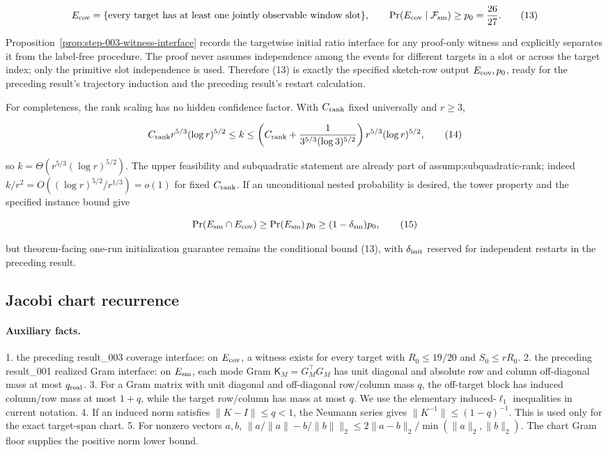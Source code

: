 \[
E_{\rm cov}=\{\text{every target has at least one jointly observable
window slot}\},\qquad
\Pr(E_{\rm cov}\mid\mathcal F_{\rm sm})\ge p_0={26\over27}.
\tag{13}
\]

Proposition~\ref{prop:step-003-witness-interface} records the targetwise initial
ratio interface for any proof-only witness and explicitly separates it from
the label-free procedure. The proof never assumes independence among the
events for different targets in a slot or across the target index; only the
primitive slot independence is used. Therefore (13) is exactly the
specified sketch-row output \(E_{\rm cov},p_0\), ready for the preceding result's
trajectory induction and the preceding result's restart calculation.

For completeness, the rank scaling has no hidden confidence factor. With
\(C_{\rm rank}\) fixed universally and \(r\ge3\),

\[
C_{\rm rank}r^{5/3}(\log r)^{5/2}\le k
\le\left(C_{\rm rank}+{1\over3^{5/3}(\log3)^{5/2}}\right)
 r^{5/3}(\log r)^{5/2},
\tag{14}
\]

so \(k=\Theta(r^{5/3}(\log r)^{5/2})\). The upper feasibility and
subquadratic statement are already part of assump:subquadratic-rank;
indeed \(k/r^2=O((\log r)^{5/2}/r^{1/3})=o(1)\) for fixed
\(C_{\rm rank}\). If an unconditional nested probability is desired, the
tower property and the specified instance bound give

\[
\Pr(E_{\rm sm}\cap E_{\rm cov})\ge
\Pr(E_{\rm sm})\,p_0\ge(1-\delta_{\rm sm})p_0,
\tag{15}
\]

but theorem-facing one-run initialization guarantee remains the
conditional bound (13), with \(\delta_{\rm init}\) reserved for independent
restarts in the preceding result.

\subsection{Jacobi chart recurrence}\label{app:step-004}

\paragraph{Auxiliary facts.}

1. the preceding result\_003 coverage interface: on \(E_{\rm cov}\), a witness
   exists for every target with \(R_0\le19/20\) and \(S_0\le rR_0\).
2. the preceding result\_001 realized Gram interface: on \(E_{\rm sm}\), each mode
   Gram \(\mathsf K_M=G_M^\top G_M\) has unit diagonal and absolute row and column
   off-diagonal mass at most \(q_{\rm real}\).
3. For a Gram matrix with unit diagonal and off-diagonal row/column mass
   \(q\), the off-target block has induced column/row mass at most \(1+q\),
   while the target row/column has mass at most \(q\). We use the elementary
   induced-\(\ell_1\) inequalities in current notation.
4. If an induced norm satisfies \(\|K-I\|\le q<1\), the Neumann series gives
   \(\|K^{-1}\|\le(1-q)^{-1}\). This is used only for the exact target-span
   chart.
5. For nonzero vectors \(a,b\),
   \(\|a/\|a\|-b/\|b\|\|_2\le
   2\|a-b\|_2/\min(\|a\|_2,\|b\|_2)\). The chart Gram floor supplies the
   positive norm lower bound.

